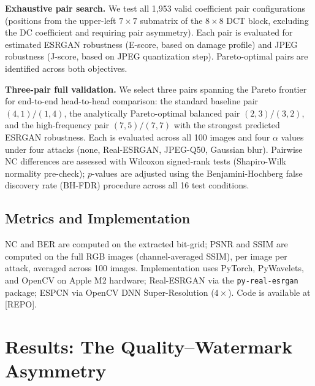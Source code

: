 \documentclass[conference]{IEEEtran}
\begin{document}
\textbf{Exhaustive pair search.} We test all 1,953 valid coefficient
pair configurations (positions from the upper-left $7\times7$ submatrix
of the $8\times8$ DCT block, excluding the DC coefficient and requiring
pair asymmetry). Each pair is evaluated for estimated ESRGAN robustness
(E-score, based on damage profile) and JPEG robustness (J-score, based
on JPEG quantization step). Pareto-optimal pairs are identified across
both objectives.

\textbf{Three-pair full validation.} We select three pairs spanning the
Pareto frontier for end-to-end head-to-head comparison: the standard
baseline pair $(4,1)/(1,4)$, the analytically Pareto-optimal balanced
pair $(2,3)/(3,2)$, and the high-frequency pair $(7,5)/(7,7)$ with the
strongest predicted ESRGAN robustness. Each is evaluated across all 100
images and four $\alpha$ values under four attacks (none, Real-ESRGAN,
JPEG-Q50, Gaussian blur). Pairwise NC differences are assessed with
Wilcoxon signed-rank tests (Shapiro-Wilk normality pre-check); $p$-values
are adjusted using the Benjamini-Hochberg false discovery rate (BH-FDR)
procedure across all 16 test conditions.

\subsection{Metrics and Implementation}
NC and BER are computed on the extracted bit-grid; PSNR and SSIM
\cite{ssim2004} are computed on the full RGB images (channel-averaged
SSIM), per image per attack, averaged across 100 images. Implementation uses
PyTorch, PyWavelets, and OpenCV on Apple M2 hardware; Real-ESRGAN via
the \texttt{py-real-esrgan} package; ESPCN via OpenCV DNN
Super-Resolution ($4\times$). Code is available at [REPO].

\section{Results: The Quality--Watermark Asymmetry}
\label{sec:results}
\end{document}
